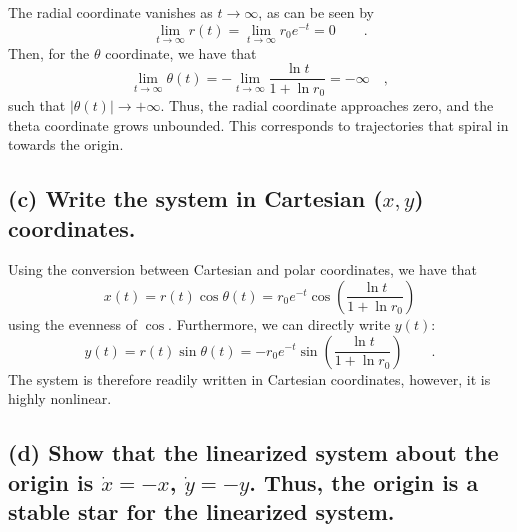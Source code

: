 \documentclass[draft]{agujournal2019}
\begin{document}
The radial coordinate vanishes as $t\longrightarrow\infty$, as can be seen by 
\begin{equation*}
    \lim_{t\longrightarrow\infty} r(t) = \lim_{t\longrightarrow\infty} r_0 e^{-t} = 0 \qquad .
\end{equation*}
Then, for the $\theta$ coordinate, we have that 
\begin{equation*}
    \lim_{t\longrightarrow\infty} \theta(t) = - \lim_{t\longrightarrow\infty} \frac{\ln{t}}{1 + \ln{r_0}} = -\infty \quad ,
\end{equation*}
such that $|\theta(t)|\longrightarrow+\infty$. Thus, the radial coordinate approaches zero, and the theta coordinate grows unbounded. This corresponds to trajectories that spiral in towards the origin. 

\subsection{(c) Write the system in Cartesian ($x,y$) coordinates.}
\label{ssec:p6c}

Using the conversion between Cartesian and polar coordinates, we have that 
\begin{equation*}
    x(t) = r(t) \cos{\theta(t)} = r_0 e^{-t} \cos{\left(\frac{\ln{t}}{1 + \ln{r_0}}\right)}
\end{equation*}
using the evenness of $\cos$. Furthermore, we can directly write $y(t)$:
\begin{equation*}
    y(t) = r(t) \sin{\theta(t)} = - r_0 e^{-t} \sin{\left(\frac{\ln{t}}{1 + \ln{r_0}}\right)} \qquad .
\end{equation*}
The system is therefore readily written in Cartesian coordinates, however, it is highly nonlinear.

\subsection{(d) Show that the linearized system about the origin is $\dot x = -x$, $\dot y = -y$. Thus, the origin is a stable star for the linearized system. }
\label{ssec:p6d}
\end{document}
